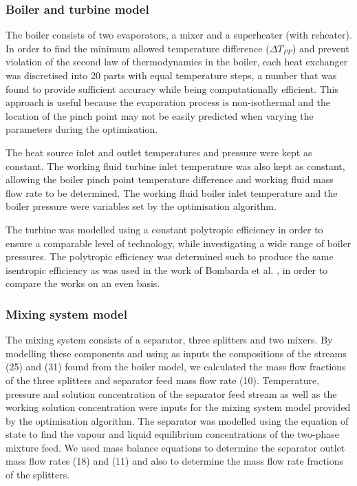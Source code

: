 \documentclass[review,3p]{elsarticle}
\begin{document}
\subsubsection{Boiler and turbine model}
The boiler consists of two evaporators, a mixer and a superheater (with reheater). In order to find the minimum allowed temperature difference ($\Delta T_{PP}$) and prevent violation of the second law of thermodynamics in the boiler, each heat exchanger was discretised into 20 parts with equal temperature steps, a number that was found to provide sufficient accuracy while being computationally efficient. This approach is useful because the evaporation process is non-isothermal and the location of the pinch point may not be easily predicted when varying the parameters during the optimisation.

The heat source inlet and outlet temperatures and pressure were kept as constant. The working fluid turbine inlet temperature was also kept as constant, allowing the boiler pinch point temperature difference and working fluid mass flow rate to be determined. The working fluid boiler inlet temperature and the boiler pressure were variables set by the optimisation algorithm.

The turbine was modelled using a constant polytropic efficiency in order to ensure a comparable level of technology, while investigating a wide range of boiler pressures. The polytropic efficiency was determined such to produce the same isentropic efficiency as was used in the work of Bombarda et al. \cite{Bombarda2010b}, in order to compare the works on an even basis.





\subsubsection{Mixing system model}
The mixing system consists of a separator, three splitters and two mixers. By modelling these components and using as inputs the compositions of the streams (25) and (31) found from the boiler model, we calculated the mass flow fractions of the three splitters and separator feed mass flow rate (10). Temperature, pressure and solution concentration of the separator feed stream as well as the working solution concentration were inputs for the mixing system model provided by the optimisation algorithm. The separator was modelled using the equation of state to find the vapour and liquid equilibrium concentrations of the two-phase mixture feed. We used mass balance equations to determine the separator outlet mass flow rates (18) and (11) and also to determine the mass flow rate fractions of the splitters.
\end{document}

